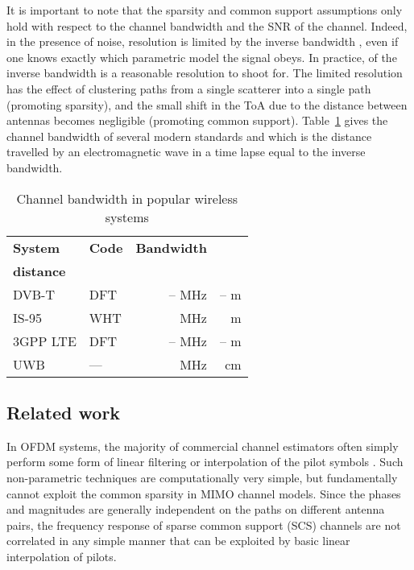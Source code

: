 \documentclass[journal,10pt]{IEEEtran}
\renewcommand{\arraystretch}{1.2}
\newcommand{\ra}[1]{\renewcommand{\arraystretch}{#1}}
\begin{document}
It is important to note that the sparsity and common support assumptions only hold with respect to the channel bandwidth  and the SNR of the channel. Indeed, in the presence of noise, resolution is limited by the inverse bandwidth , even if one knows exactly which parametric model the signal obeys. In practice,  of the inverse bandwidth is a reasonable resolution to shoot for. The limited resolution has the effect of clustering paths from a single scatterer into a single path (promoting sparsity), and the small shift in the ToA due to the distance between antennas becomes negligible (promoting common support). Table~\ref{tabl:invB} gives the channel bandwidth of several modern standards and  which is the distance travelled by an electromagnetic wave in a time lapse equal to the inverse bandwidth.

\begin{table}[t]\centering  \ra{1.3}\caption{Channel bandwidth in popular wireless systems}
\begin{tabular}{@{}llrr@{}}\toprule
\textbf{System} & \textbf{Code}& \textbf{Bandwidth}  & \begin{array}{r}\textbf{Resolvable}\vspace{-8pt}\\ \textbf{distance } \end{array} \\\midrule
DVB-T \cite{ETSI2001}& DFT & -- MHz & -- m\\
IS-95  \cite{Garg2000}& WHT&  MHz &  m\\3GPP LTE \cite{Dahlman2008}& DFT & -- MHz & -- m\\   UWB & --- &   MHz &  cm\\
\bottomrule
\end{tabular} \label{tabl:invB}\vspace{-4mm}
\end{table}


\subsection{Related work}
In OFDM systems, the majority of commercial channel estimators often simply perform 
some form of linear filtering or interpolation of the pilot symbols \cite{RanaKC:10,KarakayaAC:08}.
Such non-parametric techniques are computationally very simple, but fundamentally 
cannot exploit the common sparsity in MIMO channel models. Since the phases and magnitudes are generally independent on the paths on different antenna pairs, the frequency response of sparse common support (SCS) channels are not correlated in any simple manner that can be exploited by basic linear interpolation of pilots.
\end{document}
